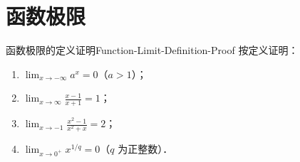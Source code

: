\section{函数极限}

\begin{problem}{函数极限的定义证明}{Function-Limit-Definition-Proof}
    按定义证明：
    \begin{enumerate}
        \item $\lim_{x\to -\infty} a^x = 0$（$a > 1$）；
        \item $\lim_{x\to\infty} \frac{x-1}{x+1} = 1$；
        \item $\lim_{x\to -1} \frac{x^2-1}{x^2+x} = 2$；
        \item $\lim_{x\to 0^+} x^{1/q} = 0$（$q$ 为正整数）．
    \end{enumerate}
\end{problem}

